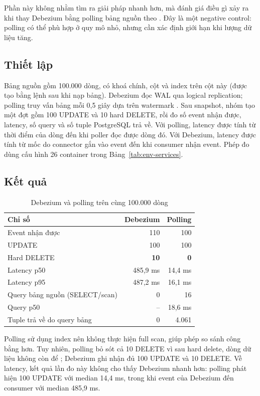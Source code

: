 Phần này không nhằm tìm ra giải pháp nhanh hơn, mà đánh giá điều gì xảy ra khi thay Debezium bằng polling bảng nguồn theo . Đây là một negative control: polling có thể phù hợp ở quy mô nhỏ, nhưng cần xác định giới hạn khi lượng dữ liệu tăng.

\subsection{Thiết lập}

Bảng nguồn  gồm 100.000 dòng, có khoá chính, cột  và index trên cột này (được tạo bằng lệnh  sau khi nạp bảng). Debezium đọc WAL qua logical replication; polling truy vấn bảng mỗi 0,5 giây dựa trên watermark . Sau snapshot, nhóm tạo một đợt gồm 100 UPDATE và 10 hard DELETE, rồi đo số event nhận được, latency, số query và số tuple PostgreSQL trả về. Với polling, latency được tính từ thời điểm  của dòng đến khi poller đọc được dòng đó. Với Debezium, latency được tính từ mốc  do connector gắn vào event đến khi consumer nhận event. Phép đo dùng cấu hình 26 container trong Bảng~\ref{tab:env-services}.

\subsection{Kết quả}

\begin{table}[H]
\centering\small
\caption{Debezium và polling trên cùng 100.000 dòng}
\label{tab:cdc}
\begin{tabular}{@{}lrr@{}}
\toprule
\textbf{Chỉ số} & \textbf{Debezium} & \textbf{Polling} \\
\midrule
Event nhận được & 110 & 100 \\
UPDATE & 100 & 100 \\
Hard DELETE & \textbf{10} & \textbf{0} \\
Latency p50 & 485,9 ms & 14,4 ms \\
Latency p95 & 487,2 ms & 16,1 ms \\
Query bảng nguồn (SELECT/scan) & 0 & 16 \\
Query p50 & -- & 18,6 ms \\
Tuple trả về do query bảng & 0 & 4.061 \\
\bottomrule
\end{tabular}
\end{table}

Polling sử dụng index nên không thực hiện full scan, giúp phép so sánh công bằng hơn. Tuy nhiên, polling bỏ sót cả 10 DELETE vì sau hard delete, dòng dữ liệu không còn để ; Debezium ghi nhận đủ 100 UPDATE và 10 DELETE. Về latency, kết quả lần đo này không cho thấy Debezium nhanh hơn: polling phát hiện 100 UPDATE với median 14,4 ms, trong khi event của Debezium đến consumer với median 485,9 ms.

